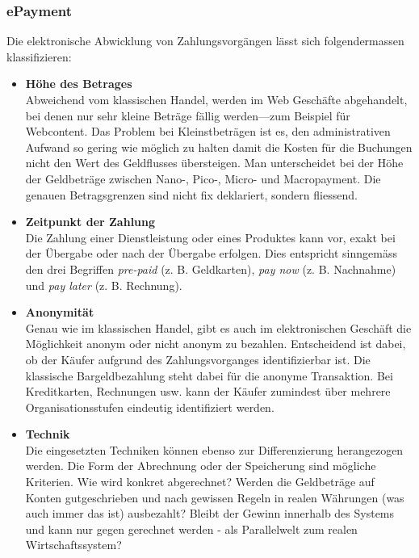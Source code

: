 \subsubsection*{ePayment}

Die elektronische Abwicklung von Zahlungsvorgängen lässt sich folgendermassen
klassifizieren:

\begin{itemize}
    \item\textbf{Höhe des Betrages} \\
    Abweichend vom klassischen Handel, werden im Web Geschäfte abgehandelt,
    bei denen nur sehr kleine Beträge fällig werden---zum Beispiel für Webcontent.
    Das Problem bei Kleinstbeträgen ist es, den administrativen Aufwand so gering
    wie möglich zu halten damit die Kosten für die Buchungen nicht den Wert des
    Geldflusses übersteigen. Man unterscheidet bei der Höhe der Geldbeträge
    zwischen Nano-, Pico-, Micro- und Macropayment. Die genauen Betragsgrenzen
    sind nicht fix deklariert, sondern fliessend.
    \item\textbf{Zeitpunkt der Zahlung} \\
    Die Zahlung einer Dienstleistung oder eines Produktes kann vor, exakt bei
    der Übergabe oder nach der Übergabe erfolgen. Dies entspricht sinngemäss
    den drei Begriffen \emph{pre-paid} (z. B. Geldkarten), \emph{pay now}
    (z. B. Nachnahme) und \emph{pay later} (z. B. Rechnung).
    \item\textbf{Anonymität} \\
    Genau wie im klassischen Handel, gibt es auch im elektronischen Geschäft
    die Möglichkeit anonym oder nicht anonym zu bezahlen. Entscheidend ist
    dabei, ob der Käufer aufgrund des Zahlungsvorganges identifizierbar ist.
    Die klassische Bargeldbezahlung steht dabei für die anonyme Transaktion.
    Bei Kreditkarten, Rechnungen usw. kann der Käufer zumindest über mehrere
    Organisationsstufen eindeutig identifiziert werden.
    \item\textbf{Technik} \\
    Die eingesetzten Techniken können ebenso zur Differenzierung herangezogen
    werden. Die Form der Abrechnung oder der Speicherung sind mögliche Kriterien.
    Wie wird konkret abgerechnet? Werden die Geldbeträge auf Konten gutgeschrieben
    und nach gewissen Regeln in realen Währungen (was auch immer das ist)
    ausbezahlt? Bleibt der Gewinn innerhalb des Systems und kann nur gegen
    gerechnet werden - als Parallelwelt zum realen Wirtschaftssystem?
\end{itemize}

